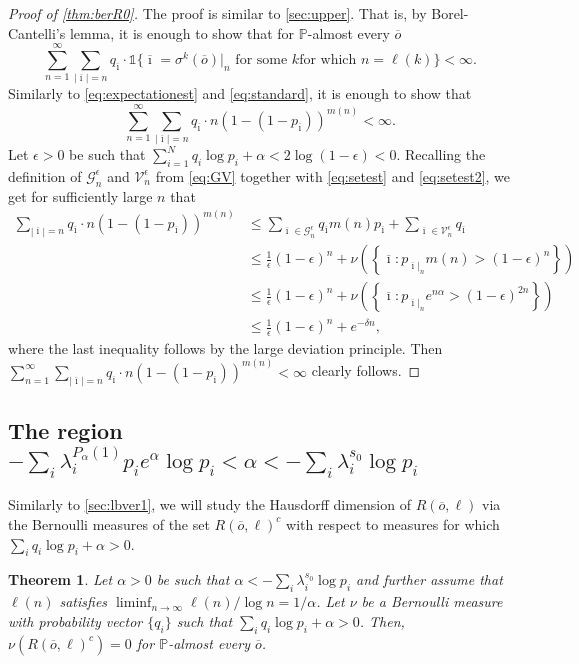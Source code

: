 \documentclass[12pt,]{article}
\newtheorem{theorem}{Theorem}[section]
\theoremstyle{definition}
\theoremstyle{remark}
\renewcommand{\Bbb}[1]{\mathbb{#1}}
\newcommand{\bbP}{{\Bbb P}}
\newcommand{\0}{\mathbf{0}}
\newcommand{\bi}{{\overline {\imath}}}
\newcommand{\bo}{{\overline o}}
\begin{document}
\begin{proof}[Proof of \cref{thm:berR0}]
  The proof is similar to \cref{sec:upper}. That is, by Borel-Cantelli's lemma, it is enough to show
  that for $\bbP$-almost every $\bo$
  \[
    \sum_{n=1}^\infty \sum_{|\bi|=n}q_{\bi}\cdot\mathbb 1\{\bi=\sigma^k(\bo)|_n \text{ for some $k$
    for which }n=\ell(k)\}<\infty.
  \]
  Similarly to \cref{eq:expectationest} and \cref{eq:standard}, it is enough to show that
  \[
    \sum_{n=1}^\infty \sum_{|\bi|=n}q_{\bi}\cdot n(1-(1-p_{\bi}))^{m(n)}<\infty.
  \]
  Let $\epsilon>0$ be such that $\sum_{i=1}^Nq_i\log p_i+\alpha<2\log(1-\epsilon)<0$. Recalling the
  definition of $\mathcal{G}_n^\epsilon$ and $\mathcal{V}_n^\epsilon$ from \cref{eq:GV} together
  with \cref{eq:setest} and \cref{eq:setest2}, we get for sufficiently large $n$ that
  \[\begin{split}
    \sum_{|\bi|=n}q_{\bi}\cdot n(1-(1-p_{\bi}))^{m(n)}
    &\leq \sum_{\bi\in\mathcal{G}_n^\epsilon}q_{\bi}m(n)p_{\bi}+\sum_{\bi\in\mathcal{V}_n^\epsilon}q_{\bi}\\
    &\leq \tfrac1\epsilon(1-\epsilon)^n+\nu\left(\left\{\bi: p_{\bi|_n}m(n)>(1-\epsilon)^n\right\}\right)\\
    &\leq \tfrac1\epsilon(1-\epsilon)^n+\nu\left(\left\{\bi: p_{\bi|_n}e^{n\alpha}>(1-\epsilon)^{2n}\right\}\right)\\
    &\leq \tfrac1\epsilon(1-\epsilon)^n+e^{-\delta n},
  \end{split}\]
  where the last inequality follows by the large deviation principle. Then $\sum_{n=1}^\infty
  \sum_{|\bi|=n}q_{\bi}\cdot n(1-(1-p_{\bi}))^{m(n)}<\infty$ clearly follows.
\end{proof}

\subsection{The region \texorpdfstring{$-\sum_i\lambda_i^{P_\alpha(1)}p_ie^\alpha\log
p_i<\alpha<-\sum_i\lambda_i^{s_0}\log p_i$}{low values}}

Similarly to \cref{sec:lbver1}, we will study the Hausdorff dimension of $R(\bo,\ell)$ via the
Bernoulli measures of the set $R(\bo,\ell)^c$ with respect to measures for which $\sum_iq_i\log
p_i+\alpha>0$.

\begin{theorem}\label{thm:berRc0}
  Let $\alpha>0$ be such that $\alpha<-\sum_i\lambda_i^{s_0}\log p_i$ and further assume that $\ell(n)$ satisfies
  $\liminf_{n\to\infty}\ell(n)/\log n = 1/\alpha$. Let $\nu$ be a Bernoulli measure with probability
  vector $\{q_i\}$ such that $\sum_iq_i\log p_i+\alpha>0$. Then, $\nu(R(\bo,\ell)^c) =0$ for
  $\bbP$-almost every $\bo$.
\end{theorem}
\end{document}
